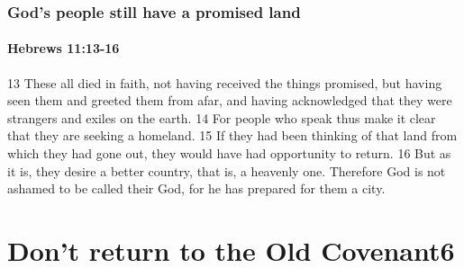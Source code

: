 \begin{frame}
\frametitle{God's people still have a promised land}
\framesubtitle{Hebrews 11:13-16}
13 These all died in faith, not having received the things promised, but having seen them and greeted them from afar, and having acknowledged that they were strangers and exiles on the earth. 14 For people who speak thus make it clear that they are seeking a homeland. 15 If they had been thinking of that land from which they had gone out, they would have had opportunity to return. 16 But as it is, they desire a better country, that is, a heavenly one. Therefore God is not ashamed to be called their God, for he has prepared for them a city.

\end{frame}

\section{Don't return to the Old Covenant6}


